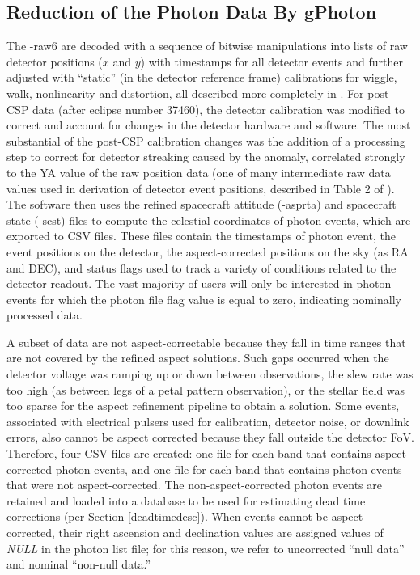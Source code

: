 \documentclass[iop]{emulateapj}
\begin{document}
\subsection{Reduction of the Photon Data By gPhoton}
The -raw6 are decoded with a sequence of bitwise manipulations into lists of raw detector positions ($x$ and $y$) with timestamps for all detector events and further adjusted with ``static'' (in the detector reference frame) calibrations for wiggle, walk, nonlinearity and distortion, all described more completely in \citet{mor2007}. For post-CSP data (after eclipse number 37460), the detector calibration was modified to correct and account for changes in the detector hardware and software. The most substantial of the post-CSP calibration changes was the addition of a processing step to correct for detector streaking caused by the anomaly, correlated strongly to the YA value of the raw position data (one of many intermediate raw data values used in derivation of detector event positions, described in Table 2 of \cite{mor2007}). The software then uses the refined spacecraft attitude (-asprta) and spacecraft state (-scst) files to compute the celestial coordinates of photon events, which are exported to CSV files. These files contain the timestamps of photon event, the event positions on the detector, the aspect-corrected positions on the sky (as RA and DEC), and status flags used to track a variety of conditions related to the detector readout. The vast majority of users will only be interested in photon events for which the photon file flag value is equal to zero, indicating nominally processed data.

A subset of data are not aspect-correctable because they fall in time ranges that are not covered by the refined aspect solutions. Such gaps occurred when the detector voltage was ramping up or down between observations, the slew rate was too high (as between legs of a petal pattern observation), or the stellar field was too sparse for the aspect refinement pipeline to obtain a solution. Some events, associated with electrical pulsers used for calibration, detector noise, or downlink errors, also cannot be aspect corrected because they fall outside the detector FoV. Therefore, four CSV files are created: one file for each band that contains aspect-corrected photon events, and one file for each band that contains photon events that were not aspect-corrected. The non-aspect-corrected photon events are retained and loaded into a database to be used for estimating dead time corrections (per Section \ref{deadtimedesc}). When events cannot be aspect-corrected, their right ascension and declination values are assigned values of \emph{NULL} in the photon list file; for this reason, we refer to uncorrected ``null data'' and nominal ``non-null data.''
\end{document}
